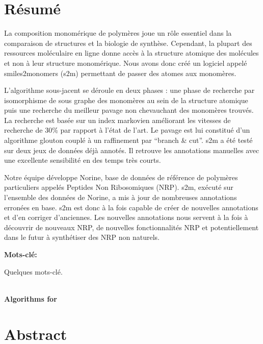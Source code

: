 \documentclass[12pt]{LHSV_thesis}
\begin{document}
\section*{\Huge Résumé}
%

La composition monomérique de polymères joue un rôle essentiel dans la comparaison de structures et la biologie de synthèse.
Cependant, la plupart des ressources moléculaire en ligne donne accès à la structure atomique des molécules et non à leur structure monomérique.
Nous avons donc créé un logiciel appelé smiles2monomers (s2m) permettant de passer des atomes aux monomères.

L'algorithme sous-jacent se déroule en deux phases : une phase de recherche par isomorphisme de sous graphe des monomères au sein de la structure atomique puis une recherche du meilleur pavage non chevauchant des monomères trouvés.
La recherche est basée sur un index markovien améliorant les vitesses de recherche de 30\% par rapport à l'état de l'art.
Le pavage est lui constitué d'un algorithme glouton couplé à un raffinement par ``branch \& cut''.
s2m a été testé sur deux jeux de données déjà annotés.
Il retrouve les annotations manuelles avec une excellente sensibilité en des temps très courts.

Notre équipe développe Norine, base de données de référence de polymères particuliers appelés Peptides Non Ribosomiques (NRP).
s2m, exécuté sur l'ensemble des données de Norine, a mis à jour de nombreuses annotations erronées en base.
s2m est donc à la fois capable de créer de nouvelles annotations et d'en corriger d'anciennes.
Les nouvelles annotations nous servent à la fois à découvrir de nouveaux NRP, de nouvelles fonctionnalités NRP et potentiellement dans le futur à synthétiser des NRP non naturels.


\vspace*{28pt}\par
\textbf{Mots-clé:}\par
Quelques mots-clé.
\par
\clearpage

\begin{center}
~\vspace{6.0cm}\\
\thispagestyle{plain}
\Huge \textbf{Algorithms for }
\vspace*{\fill}
\clearpage
\end{center}

\section*{\Huge Abstract}
%
\vspace{2cm}
\end{document}

